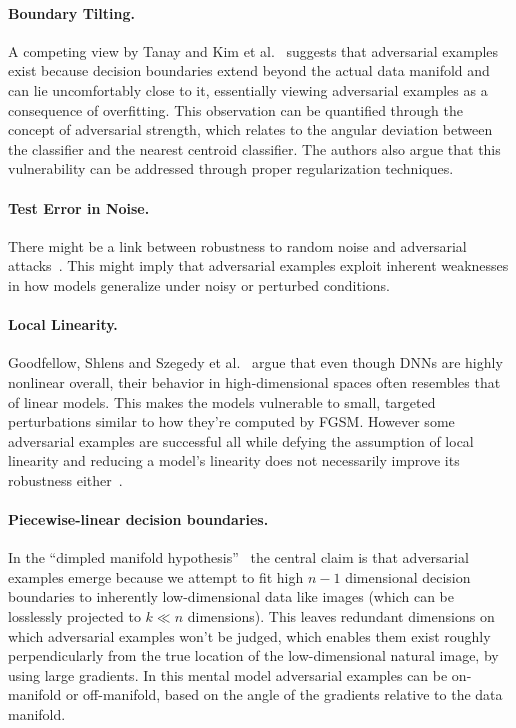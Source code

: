 \documentclass[a4paper, oneside]{discothesis}
\begin{document}
\paragraph{Boundary Tilting.} A competing view by Tanay and Kim et al.\ \cite{tanay2016boundary,kim2019bridging} suggests that adversarial examples exist because decision boundaries extend beyond the actual data manifold and can lie uncomfortably close to it, essentially viewing adversarial examples as a consequence of overfitting. This observation can be quantified through the concept of adversarial strength, which relates to the angular deviation between the classifier and the nearest centroid classifier. The authors also argue that this vulnerability can be addressed through proper regularization techniques.

\paragraph{Test Error in Noise.} There might be a link between robustness to random noise and adversarial attacks~\cite{fawzi2016robustness, lecuyer2019certified, cohen2019certified, ford2019adversarial}. This might imply that adversarial examples exploit inherent weaknesses in how models generalize under noisy or perturbed conditions.

\paragraph{Local Linearity.} Goodfellow, Shlens and Szegedy et al.\ \cite{goodfellow2014explaining, madry2017towards} argue that even though DNNs are highly nonlinear overall, their behavior in high-dimensional spaces often resembles that of linear models. This makes the models vulnerable to small, targeted perturbations similar to how they're computed by FGSM. However some adversarial examples are successful all while defying the assumption of local linearity and reducing a model's linearity does not necessarily improve its robustness either~\cite{athalye2018obfuscated}.

\paragraph{Piecewise-linear decision boundaries.} In the ``dimpled manifold hypothesis''~\cite{shamir2021dimpled} the central claim is that adversarial examples emerge because we attempt to fit high $n-1$ dimensional decision boundaries to inherently low-dimensional data like images (which can be losslessly projected to $k \ll n$ dimensions). This leaves redundant dimensions on which adversarial examples won't be judged, which enables them exist roughly perpendicularly from the true location of the low-dimensional natural image, by using large gradients. In this mental model adversarial examples can be on-manifold or off-manifold, based on the angle of the gradients relative to the data manifold.
\end{document}
